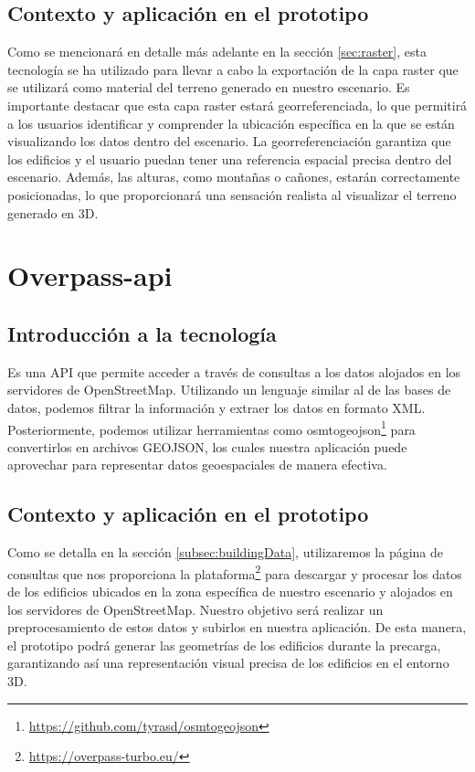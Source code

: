 \documentclass[a4paper, 11pt]{book}
\begin{document}
\subsection{Contexto y aplicación en el prototipo}
Como se mencionará en detalle más adelante en la sección \ref{sec:raster}, esta tecnología se ha utilizado para llevar a cabo la exportación de la capa raster que se utilizará como material del terreno generado en nuestro escenario. Es importante destacar que esta capa raster estará georreferenciada, lo que permitirá a los usuarios identificar y comprender la ubicación específica en la que se están visualizando los datos dentro del escenario.
La georreferenciación garantiza que los edificios y el usuario puedan tener una referencia espacial precisa dentro del escenario. Además, las alturas, como montañas o cañones, estarán correctamente posicionadas, lo que proporcionará una sensación realista al visualizar el terreno generado en 3D.
\section{Overpass-api}
\subsection{Introducción a la tecnología}
Es una API que permite acceder a través de consultas a los datos alojados en los servidores de OpenStreetMap. Utilizando un lenguaje similar al de las bases de datos, podemos filtrar la información y extraer los datos en formato XML. Posteriormente, podemos utilizar herramientas como osmtogeojson\footnote{\url{https://github.com/tyrasd/osmtogeojson}} para convertirlos en archivos GEOJSON, los cuales nuestra aplicación puede aprovechar para representar datos geoespaciales de manera efectiva.
\subsection{Contexto y aplicación en el prototipo}
Como se detalla en la sección \ref{subsec:buildingData}, utilizaremos la página de consultas que nos proporciona la plataforma\footnote{\url{https://overpass-turbo.eu/}} para descargar y procesar los datos de los edificios ubicados en la zona específica de nuestro escenario y alojados en los servidores de OpenStreetMap. Nuestro objetivo será realizar un preprocesamiento de estos datos y subirlos en nuestra aplicación. De esta manera, el prototipo podrá generar las geometrías de los edificios durante la precarga, garantizando así una representación visual precisa de los edificios en el entorno 3D.
\end{document}
